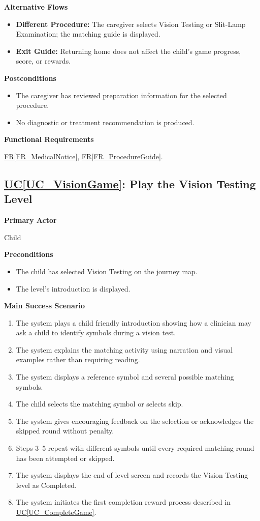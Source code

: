 \documentclass[12pt]{article}
\newcounter{ucnum} %
\newcommand{\ucref}[1]{\hyperref[#1]{UC\ref*{#1}}}
\newcommand{\rref}[1]{\hyperref[#1]{FR\ref*{#1}}}
\begin{document}
\textbf{Alternative Flows}
\begin{itemize}
    \item \textbf{Different Procedure:} The caregiver selects Vision
    Testing or Slit-Lamp Examination; the matching guide is displayed.
    \item \textbf{Exit Guide:} Returning home does not affect the
    child's game progress, score, or rewards.
\end{itemize}

\textbf{Postconditions}
\begin{itemize}
    \item The caregiver has reviewed preparation information for
    the selected procedure.
    \item No diagnostic or treatment recommendation is produced.
\end{itemize}

\textbf{Functional Requirements}

\rref{FR_MedicalNotice}, \rref{FR_ProcedureGuide}.

\label{UC_VisionGame}
\subsection{\ucref{UC_VisionGame}: Play the Vision Testing Level}

\textbf{Primary Actor}

Child

\textbf{Preconditions}
\begin{itemize}
    \item The child has selected Vision Testing on the journey map.
    \item The level's introduction is displayed.
\end{itemize}

\textbf{Main Success Scenario}
\begin{enumerate}
    \item The system plays a child friendly introduction showing
    how a clinician may ask a child to identify symbols during
    a vision test.
    \item The system explains the matching activity using narration
    and visual examples rather than requiring reading.
    \item The system displays a reference symbol and several
    possible matching symbols.
    \item The child selects the matching symbol or selects skip.
    \item The system gives encouraging feedback on the selection
    or acknowledges the skipped round without penalty.
    \item Steps 3--5 repeat with different symbols until every
    required matching round has been attempted or skipped.
    \item The system displays the end of level screen and records
    the Vision Testing level as Completed.
    \item The system initiates the first completion reward process
    described in \ucref{UC_CompleteGame}.
\end{enumerate}
\end{document}
